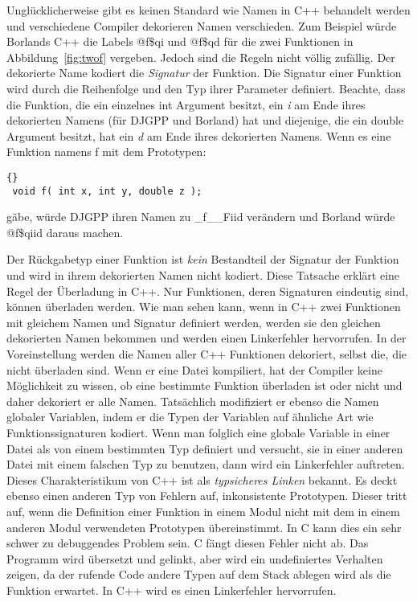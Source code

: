 Ungl\"{u}cklicherweise gibt es keinen Standard wie Namen in C++
behandelt werden und verschiedene Compiler dekorieren Namen
verschieden. Zum Beispiel w\"{u}rde Borlands C++
 die Labels {\code @f\$qi} und {\code
@f\$qd} f\"{u}r die zwei Funktionen in Abbildung~\ref{fig:twof}
vergeben. Jedoch sind die Regeln nicht v\"{o}llig zuf\"{a}llig. Der
dekorierte Name kodiert die \emph{Signatur}
 der Funktion. Die Signatur einer
Funktion wird durch die Reihenfolge und den Typ ihrer Parameter
definiert. Beachte, dass die Funktion, die ein einzelnes {\code int}
Argument besitzt, ein \emph{i} am Ende ihres dekorierten Namens (f\"{u}r
DJGPP und Borland) hat und diejenige, die ein {\code double}
Argument besitzt, hat ein \emph{d} am Ende ihres dekorierten Namens.
Wenn es eine Funktion namens {\code f} mit dem Prototypen:
\begin{lstlisting}[stepnumber=0]{}
 void f( int x, int y, double z );
\end{lstlisting}
\noindent g\"{a}be, w\"{u}rde DJGPP ihren Namen zu {\code \_f\_\_Fiid}
ver\"{a}ndern und Borland w\"{u}rde {\code @f\$qiid} daraus machen.

Der R\"{u}ckgabetyp einer Funktion ist \emph{kein} Bestandteil der
Signatur der Funktion und wird in ihrem dekorierten Namen nicht
kodiert. Diese Tatsache erkl\"{a}rt eine Regel der \"{U}berladung in C++.
Nur Funktionen, deren Signaturen eindeutig sind, k\"{o}nnen \"{u}berladen
werden. Wie man sehen kann, wenn in C++ zwei Funktionen mit gleichem
Namen und Signatur definiert werden, werden sie den gleichen
dekorierten Namen bekommen und werden einen Linkerfehler
hervorrufen. In der Voreinstellung werden die Namen aller C++
Funktionen dekoriert, selbst die, die nicht \"{u}berladen sind. Wenn er
eine Datei kompiliert, hat der Compiler keine M\"{o}glichkeit zu wissen,
ob eine bestimmte Funktion \"{u}berladen ist oder nicht und daher
dekoriert er alle Namen. Tats\"{a}chlich modifiziert er ebenso die Namen
globaler Variablen, indem er die Typen der Variablen auf \"{a}hnliche
Art wie Funktionssignaturen kodiert. Wenn man folglich eine globale
Variable in einer Datei als von einem bestimmten Typ definiert und
versucht, sie in einer anderen Datei mit einem falschen Typ zu
benutzen, dann wird ein Linkerfehler auftreten. Dieses
Charakteristikum von C++ ist als \emph{typsicheres Linken}
 bekannt. Es deckt ebenso einen anderen
Typ von Fehlern auf, inkonsistente Prototypen. Dieser tritt auf,
wenn die Definition einer Funktion in einem Modul nicht mit dem in
einem anderen Modul verwendeten Prototypen \"{u}bereinstimmt. In C kann
dies ein sehr schwer zu debuggendes Problem sein. C f\"{a}ngt diesen
Fehler nicht ab. Das Programm wird \"{u}bersetzt und gelinkt, aber wird
ein undefiniertes Verhalten zeigen, da der rufende Code andere Typen
auf dem Stack ablegen wird als die Funktion erwartet. In C++ wird es
einen Linkerfehler hervorrufen.

